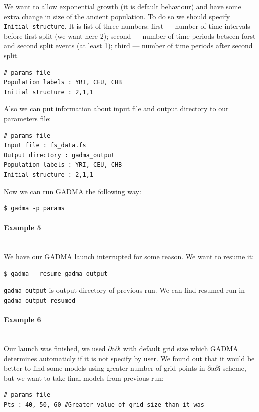 \documentclass[12pt]{article}
\makeatletter
\newcommand{\dadi}{$\partial$a$\partial$i\xspace}
\newcommand{\py}[1]{\lstinline[language=Python, showstringspaces=False]@#1@}
\makeatother
\begin{document}
We want to allow exponential growth (it is default behaviour) and have some extra change in size of the ancient population. To do so we should specify \py{Initial structure}. It is list of three numbers: first --- number of time intervals before first split (we want here 2); second --- number of time periods betseen forst and second split events (at least 1); third --- number of time periods after second split.

\begin{lstlisting}
# params_file
Population labels : YRI, CEU, CHB
Initial structure : 2,1,1
\end{lstlisting}

Also we can put information about input file and output directory to our parameters file:
\begin{lstlisting}
# params_file
Input file : fs_data.fs
Output directory : gadma_output
Population labels : YRI, CEU, CHB
Initial structure : 2,1,1
\end{lstlisting}

Now we can run GADMA the following way:
\begin{lstlisting}
$ gadma -p params
\end{lstlisting}

\paragraph{Example 5}\mbox{}\\
We have our GADMA launch interrupted for some reason. We want to resume it:
\begin{lstlisting}
$ gadma --resume gadma_output
\end{lstlisting}
\py{gadma_output} is output directory of previous run. We can find resumed run in \py{gadma_output_resumed}

\paragraph{Example 6}\mbox{}\\
Our launch was finished, we used \dadi with default grid size which GADMA determines automaticly if it is not specify by user. We found out that it would be better to find some models using greater number of grid points in \dadi scheme, but we want to take final models from previous run:

\begin{lstlisting}
# params_file
Pts : 40, 50, 60 #Greater value of grid size than it was
\end{lstlisting}
\end{document}
